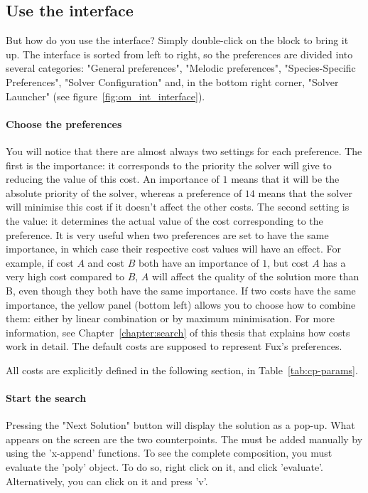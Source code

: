 \subsection*{Use the interface}
But how do you use the interface? Simply double-click on the block to bring it up. The interface is sorted from left to right, so the preferences are divided into several categories: "General preferences", "Melodic preferences", "Species-Specific Preferences", "Solver Configuration" and, in the bottom right corner, "Solver Launcher" (see figure~\ref{fig:om_int_interface}). 

\paragraph{Choose the preferences}
You will notice that there are almost always two settings for each preference. The first is the importance: it corresponds to the priority the solver will give to reducing the value of this cost. An importance of $1$ means that it will be the absolute priority of the solver, whereas a preference of $14$ means that the solver will minimise this cost if it doesn't affect the other costs. The second setting is the value: it determines the actual value of the cost corresponding to the preference. It is very useful when two preferences are set to have the same importance, in which case their respective cost values will have an effect. For example, if cost $A$ and cost $B$ both have an importance of $1$, but cost $A$ has a very high cost compared to $B$, $A$ will affect the quality of the solution more than B, even though they both have the same importance. If two costs have the same importance, the yellow panel (bottom left) allows you to choose how to combine them: either by linear combination or by maximum minimisation. For more information, see Chapter~\ref{chapter:search} of this thesis that explains how costs work in detail. The default costs are supposed to represent Fux's preferences.

All costs are explicitly defined in the following section, in Table~\ref{tab:cp-params}.

\paragraph{Start the search}
Pressing the "Next Solution" button will display the solution as a pop-up. What appears on the screen are the two counterpoints. The \cfs must be added manually by using the 'x-append' functions. To see the complete composition, you must evaluate the 'poly' object. To do so, right click on it, and click 'evaluate'. Alternatively, you can click on it and press 'v'.

